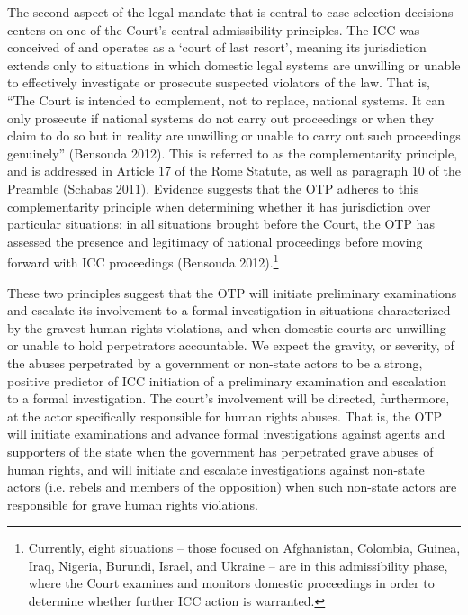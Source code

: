 The second aspect of the legal mandate that is central to case selection decisions centers on one of the Court's central admissibility principles. The ICC was conceived of and operates as a ‘court of last resort', meaning its jurisdiction extends only to situations in which domestic legal systems are unwilling or unable to effectively investigate or prosecute suspected violators of the law.  That is, ``The Court is intended to complement, not to replace, national systems. It can only prosecute if national systems do not carry out proceedings or when they claim to do so but in reality are unwilling or unable to carry out such proceedings genuinely'' (Bensouda 2012).  This is referred to as the complementarity principle, and is addressed in Article 17 of the Rome Statute, as well as paragraph 10 of the Preamble (Schabas 2011).  Evidence suggests that the OTP adheres to this complementarity principle when determining whether it has jurisdiction over particular situations: in all situations brought before the Court, the OTP has assessed the presence and legitimacy of national proceedings before moving forward with ICC proceedings (Bensouda 2012).\footnote{Currently, eight situations – those focused on Afghanistan, Colombia, Guinea, Iraq, Nigeria, Burundi, Israel, and Ukraine – are in this admissibility phase, where the Court examines and monitors domestic proceedings in order to determine whether further ICC action is warranted.}   

These two principles suggest that the OTP will initiate preliminary examinations and escalate its involvement to a formal investigation in situations characterized by the gravest human rights violations, and when domestic courts are unwilling or unable to hold perpetrators accountable.  We expect the gravity, or severity, of the abuses perpetrated by a government or non-state actors to be a strong, positive predictor of ICC initiation of a preliminary examination and escalation to a formal investigation.  The court's involvement will be directed, furthermore, at the actor specifically responsible for human rights abuses.  That is, the OTP will initiate examinations and advance formal investigations against agents and supporters of the state when the government has perpetrated grave abuses of human rights, and will initiate and escalate investigations against non-state actors (i.e. rebels and members of the opposition) when such non-state actors are responsible for grave human rights violations. 

